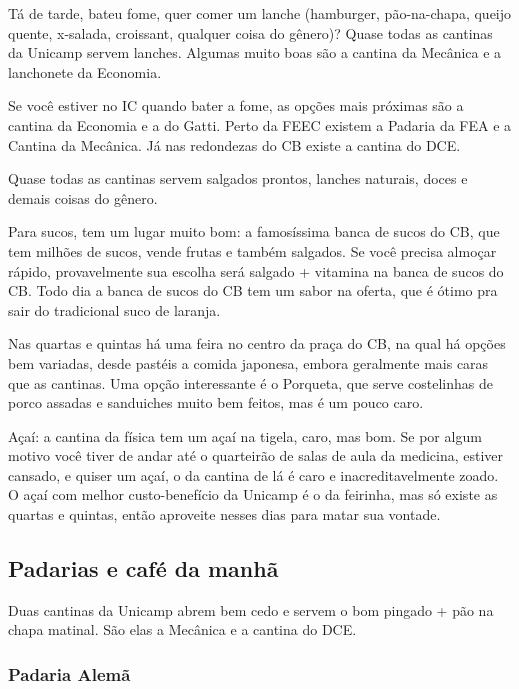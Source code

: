Tá de tarde, bateu fome, quer comer um lanche (hamburger, pão-na-chapa, queijo
quente, x-salada, croissant, qualquer coisa do gênero)? Quase todas as cantinas
da Unicamp servem lanches. Algumas muito boas são a cantina da Mecânica e a
lanchonete da Economia.

Se você estiver no IC quando bater a fome, as opções mais próximas são a cantina
da Economia e a do Gatti. Perto da FEEC existem a Padaria da FEA e a Cantina da
Mecânica. Já nas redondezas do CB existe a cantina do DCE.

Quase todas as cantinas servem salgados prontos, lanches naturais, doces e
demais coisas do gênero.

Para sucos, tem um lugar muito bom: a famosíssima banca de sucos do CB, que tem
milhões de sucos, vende frutas e também salgados.  Se você precisa almoçar
rápido, provavelmente sua escolha será salgado + vitamina na banca de sucos do
CB. Todo dia a banca de sucos do CB tem um sabor na oferta, que é ótimo pra sair
do tradicional suco de laranja.

Nas quartas e quintas há uma feira no centro da praça do CB, na qual há opções bem
variadas, desde pastéis a comida japonesa, embora geralmente mais caras que as
cantinas. Uma opção interessante é o Porqueta, que serve costelinhas de porco
assadas e sanduiches muito bem feitos, mas é um pouco caro.

Açaí: a cantina da física tem um açaí na tigela, caro, mas bom. Se por algum
motivo você tiver de andar até o quarteirão de salas de aula da medicina,
estiver cansado, e quiser um açaí, o da cantina de lá é caro e
inacreditavelmente zoado. O açaí com melhor custo-benefício da Unicamp é o da 
feirinha, mas só existe as quartas e quintas, então aproveite nesses dias para
matar sua vontade.


\subsection{Padarias e café da manhã}

Duas cantinas da Unicamp abrem bem cedo e servem o bom pingado + pão na chapa
matinal. São elas a Mecânica e a cantina do DCE.

\subsubsection{Padaria Alemã}

